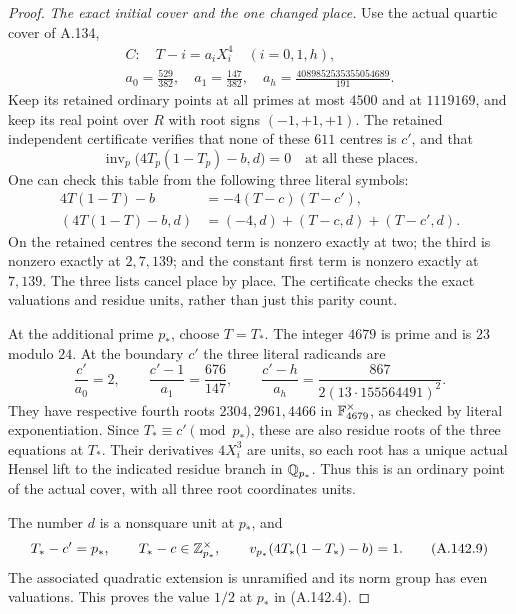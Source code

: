 \begin{proof}
\emph{The exact initial cover and the one changed place.}
Use the actual quartic cover of A.134,
\[
 \begin{gathered}
 C:\quad T-i=a_iX_i^4\quad(i=0,1,h),\\
 a_0=\frac{529}{382},\quad a_1=\frac{147}{382},\quad
 a_h=\frac{4089852535355054689}{191}.
 \end{gathered}
\tag{A.142.5}
\]
Keep its retained ordinary points at all primes at most \(4500\)
and at \(1119169\), and keep its real point over \(R\) with root
signs \((-1,+1,+1)\).  The retained independent certificate verifies
that none of these \(611\) centres is \(c'\), and that
\[
 \operatorname{inv}_p
       \bigl(4T_p(1-T_p)-b,d\bigr)=0
                   \quad\text{at all these places}.
\tag{A.142.6}
\]
One can check this table from the following three literal symbols:
\[
 \begin{aligned}
 4T(1-T)-b&=-4(T-c)(T-c'),\\
 (4T(1-T)-b,d)&=(-4,d)+(T-c,d)+(T-c',d).
 \end{aligned}
\tag{A.142.7}
\]
On the retained centres the second term is nonzero exactly at two;
the third is nonzero exactly at \(2,7,139\); and the constant first
term is nonzero exactly at \(7,139\).  The three lists cancel
place by place.  The certificate checks the exact valuations and
residue units, rather than just this parity count.

At the additional prime \(p_*\), choose \(T=T_*\).
The integer \(4679\) is prime and is \(23\) modulo \(24\).
At the boundary \(c'\) the three literal radicands are
\[
 \frac{c'}{a_0}=2,\qquad
 \frac{c'-1}{a_1}=\frac{676}{147},\qquad
 \frac{c'-h}{a_h}
        =\frac{867}{2(13\cdot155564491)^2}.
\tag{A.142.8}
\]
They have respective fourth roots
\(2304,2961,4466\) in \(\mathbb F_{4679}^\times\), as checked by
literal exponentiation.  Since \(T_*\equiv c'\pmod{p_*}\), these
are also residue roots of the three equations at \(T_*\).
Their derivatives \(4X_i^3\) are units, so each root has a unique
actual Hensel lift to the indicated residue branch in \(\mathbb Q_{p_*}\).
Thus this is an ordinary point of the actual cover, with all three
root coordinates units.

The number \(d\) is a nonsquare unit at \(p_*\), and
\[
       T_*-c'=p_*,\qquad T_*-c\in\mathbb Z_{p_*}^\times,
          \qquad v_{p_*}(4T_*(1-T_*)-b)=1.
\tag{A.142.9}
\]
The associated quadratic extension is unramified and its norm
group has even valuations.  This proves the value \(1/2\) at
\(p_*\) in (A.142.4).


\end{proof}
